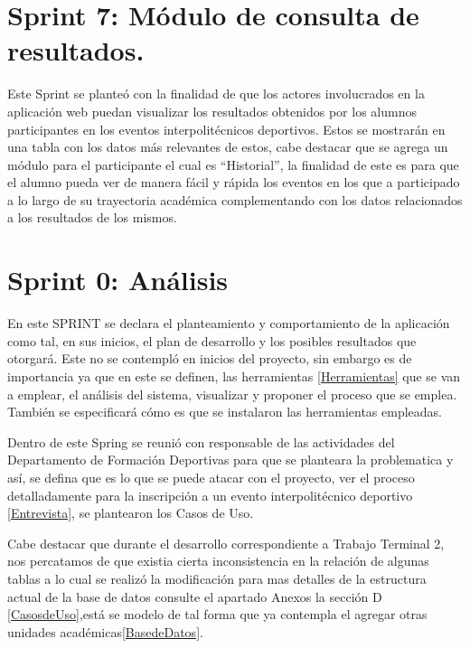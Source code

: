 	
	\section{Sprint 7: Módulo de consulta de resultados.}
	\noindent Este Sprint se planteó con la finalidad de que los actores involucrados en la aplicación web puedan visualizar los resultados obtenidos por los alumnos participantes en los eventos interpolitécnicos deportivos. 
	Estos se mostrarán en una tabla con los datos más relevantes de estos, cabe destacar que se agrega un módulo para el participante el cual es “Historial”, la finalidad de este es para que el alumno pueda ver de manera fácil y rápida los eventos en los que a participado a lo largo de su trayectoria académica complementando con los datos relacionados a los resultados de los mismos.
	
	\section{Sprint 0: Análisis}
	\noindent En este SPRINT se declara el planteamiento y comportamiento de la aplicación como tal, en sus inicios, el plan de desarrollo y los posibles resultados que otorgará.
	Este no se contempló en inicios del proyecto, sin embargo es de importancia ya que en este se definen, las herramientas \ref{Herramientas} que se van a emplear, el análisis del sistema, visualizar y proponer el proceso que se emplea.
	También se especificará cómo es que se instalaron las herramientas empleadas.
	
	\noindent Dentro de este Spring se reunió con responsable de las actividades del Departamento de Formación Deportivas para que se planteara la problematica y así, se defina que es lo que se puede atacar con el proyecto, ver el proceso detalladamente para la inscripción a un evento interpolitécnico deportivo \ref{Entrevista}, se plantearon los Casos de Uso. 
	
	\noindent Cabe destacar que durante el desarrollo correspondiente a Trabajo Terminal 2, nos percatamos de que existia cierta inconsistencia en la relación de algunas tablas a lo cual se realizó la modificación para mas detalles de la estructura actual de la base de datos consulte el apartado Anexos la sección D \ref{CasosdeUso},está se modelo de tal forma que ya contempla el agregar otras unidades académicas\ref{BasedeDatos}. 
	
